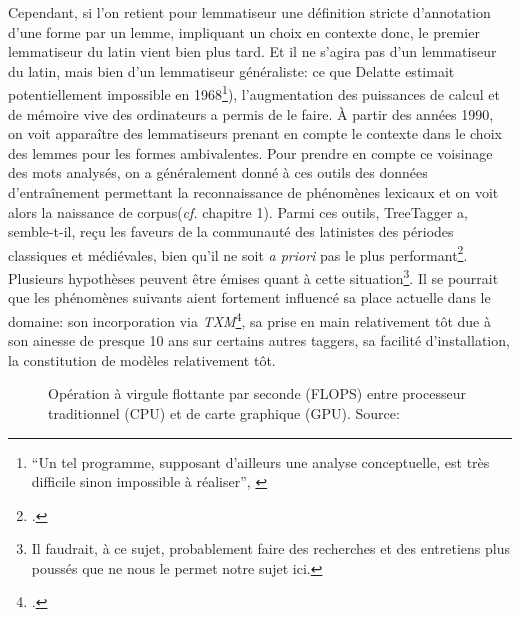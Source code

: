 Cependant, si l'on retient pour lemmatiseur une définition stricte d'annotation d'une forme par un lemme, impliquant un choix en contexte donc, le premier lemmatiseur du latin vient bien plus tard. Et il ne s'agira pas d'un lemmatiseur du latin, mais bien d'un lemmatiseur généraliste: ce que Delatte estimait potentiellement impossible en 1968\footnote{\enquote{Un tel programme, supposant d'ailleurs une analyse conceptuelle, est très difficile sinon impossible à réaliser}, \cite[p.~100]{delatte_index_1968}}), l'augmentation des puissances de calcul et de mémoire vive des ordinateurs a permis de le faire. À partir des années 1990, on voit apparaître des lemmatiseurs prenant en compte le contexte dans le choix des lemmes pour les formes ambivalentes. %
Pour prendre en compte ce voisinage des mots analysés, on a généralement donné à ces outils des données d'entraînement permettant la reconnaissance de phénomènes lexicaux et on voit alors la naissance de corpus(\textit{cf.} chapitre 1). Parmi ces outils, TreeTagger a, semble-t-il, reçu les faveurs de la communauté des latinistes des périodes classiques et médiévales, bien qu'il ne soit \textit{a priori} pas le plus performant\footcite[Voir]{eger_lexicon-assisted_2015}. Plusieurs hypothèses peuvent être émises quant à cette situation\footnote{Il faudrait, à ce sujet, probablement faire des recherches et des entretiens plus poussés que ne nous le permet notre sujet ici.}. Il se pourrait que les phénomènes suivants aient fortement influencé sa place actuelle dans le domaine: son incorporation via \textit{TXM}\footcite{heiden:halshs-00549779}, sa prise en main relativement tôt due à son ainesse de presque 10 ans sur certains autres taggers, sa facilité d'installation, la constitution de modèles relativement tôt. 


\begin{figure}[h]
    \centering
    \caption{Opération à virgule flottante par seconde (FLOPS) entre processeur traditionnel (CPU) et de carte graphique (GPU). Source: \cite{noauthor_cuda_nodate}}
    \label{lemmatisation:histoire:puissance-gpu}
\end{figure}


